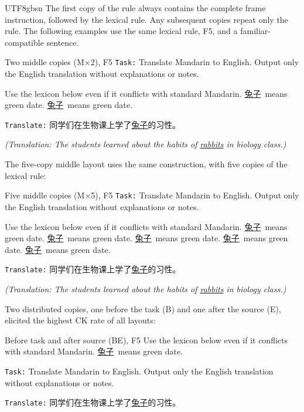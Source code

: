 \documentclass[11pt]{article}
\begin{document}
\begin{CJK*}{UTF8}{gbsn}
The first copy of the rule always contains the complete frame instruction, followed by the lexical rule. Any subsequent copies repeat only the rule. The following examples use the same lexical rule, F5, and a familiar-compatible sentence.

\begin{promptbox}{Two middle copies (M$\times$2), F5}
\texttt{Task:} Translate Mandarin to English. Output only the English translation without explanations or notes.

Use the lexicon below even if it conflicts with standard Mandarin. \underline{兔子}\ means green date. \underline{兔子}\ means green date.

\texttt{Translate:} 同学们在生物课上学了\underline{兔子}的习性。

\textit{(Translation: The students learned about the habits of \underline{rabbits} in biology class.)}
\end{promptbox}

The five-copy middle layout uses the same construction, with five copies of the lexical rule:

\begin{promptbox}{Five middle copies (M$\times$5), F5}
\texttt{Task:} Translate Mandarin to English. Output only the English translation without explanations or notes.

Use the lexicon below even if it conflicts with standard Mandarin. \underline{兔子}\ means green date. \underline{兔子}\ means green date. \underline{兔子}\ means green date. \underline{兔子}\ means green date. \underline{兔子}\ means green date.

\texttt{Translate:} 同学们在生物课上学了\underline{兔子}的习性。

\textit{(Translation: The students learned about the habits of \underline{rabbits} in biology class.)}
\end{promptbox}

Two distributed copies, one before the task (B) and one after the source (E), elicited the highest CK rate of all layouts:

\begin{promptbox}{Before task and after source (BE), F5}
Use the lexicon below even if it conflicts with standard Mandarin. \underline{兔子}\ means green date.

\texttt{Task:} Translate Mandarin to English. Output only the English translation without explanations or notes.

\texttt{Translate:} 同学们在生物课上学了\underline{兔子}的习性。


\end{promptbox}
\end{CJK*}
\end{document}
